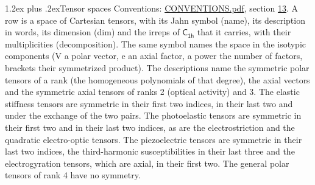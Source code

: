 \documentclass[10pt,a4paper]{article}
\makeatletter
\renewcommand\section{\@startsection{section}{1}{\z@}{-3ex plus -1ex minus -.2ex}%
  {1.2ex plus .2ex}{\normalfont\large\sffamily\bfseries\color{parttitle}}}
\numberwithin{equation}{section}
\newcommand{\grp}[1]{\mathsf{#1}}
\makeatother
\begin{document}
\section{Tensor spaces}\label{s:tensor_spaces}
Conventions: \href{../../CONVENTIONS.pdf}{CONVENTIONS.pdf}, section \href{../../CONVENTIONS.pdf\#conv.13}{13}.
\leavevmode\label{n:head.name}\label{n:head.description}\label{n:head.dim}\label{n:head.decomposition}A row is a space of Cartesian tensors, with its Jahn symbol (name), its description in words, its dimension (dim) and the irreps of $\grp{C_{1h}}$ that it carries, with their multiplicities (decomposition). \label{n:label.jahn}The same symbol names the space in the isotypic components (V a polar vector, e an axial factor, a power the number of factors, brackets their symmetrized product). The descriptions name the symmetric polar tensors of a rank (the homogeneous polynomials of that degree), the axial vectors and the symmetric axial tensors of ranks 2 (optical activity) and 3. The elastic stiffness tensors are symmetric in their first two indices, in their last two and under the exchange of the two pairs. The photoelastic tensors are symmetric in their first two and in their last two indices, as are the electrostriction and the quadratic electro-optic tensors. The piezoelectric tensors are symmetric in their last two indices, the third-harmonic susceptibilities in their last three and the electrogyration tensors, which are axial, in their first two. The general polar tensors of rank 4 have no symmetry.
\end{document}
